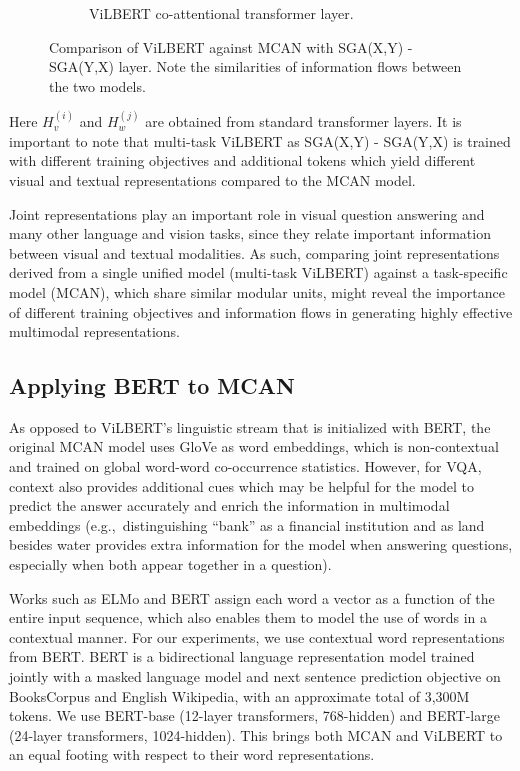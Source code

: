 \documentclass{article}
\begin{document}
\begin{figure}[ht]
\begin{subfigure}[b]{\textwidth}
	\caption{ViLBERT co-attentional transformer layer.}
	\end{subfigure}
\caption{Comparison of ViLBERT against MCAN with SGA(X,Y) - SGA(Y,X) layer. Note the similarities of information flows between the two models.}
\label{fig:vilbert_coattention}
\end{figure}

Here $H_{v}^{(i)}$ and $H_{w}^{(j)}$ are obtained from standard transformer layers. It is important to note that multi-task ViLBERT as SGA(X,Y) - SGA(Y,X) is trained with different training objectives and additional tokens which yield different visual and textual representations compared to the MCAN model. 

Joint representations play an important role in visual question answering and many other language and vision tasks, since they relate important information between visual and textual modalities. As such, comparing joint representations derived from a single unified model (multi-task ViLBERT) against a task-specific model (MCAN), which share similar modular units, might reveal the importance of different training objectives and information flows in generating highly effective multimodal representations.


\subsection{Applying BERT to MCAN}
As opposed to ViLBERT's linguistic stream that is initialized with BERT, the original MCAN model uses GloVe as word embeddings, which is non-contextual and trained on global word-word co-occurrence statistics. However, for VQA, context also provides additional cues which may be helpful for the model to predict the answer accurately and enrich the information in multimodal embeddings (e.g.,\ distinguishing ``bank'' as a financial institution and as land besides water provides extra information for the model when answering questions, especially when both appear together in a question). 

Works such as ELMo \citep{peters2018elmo} and BERT \citep{devlin-etal-2019-bert} assign each word a vector as a function of the entire input sequence, which also enables them to model the use of words in a contextual manner. For our experiments, we use contextual word representations from BERT. BERT is a bidirectional language representation model trained jointly with a masked language model and next sentence prediction objective on BooksCorpus \citep{bookscorpus} and English Wikipedia, with an approximate total of 3,300M tokens. We use BERT-base (12-layer transformers, 768-hidden) and BERT-large (24-layer transformers, 1024-hidden). This brings both MCAN and ViLBERT to an equal footing with respect to their word representations.
\end{document}

